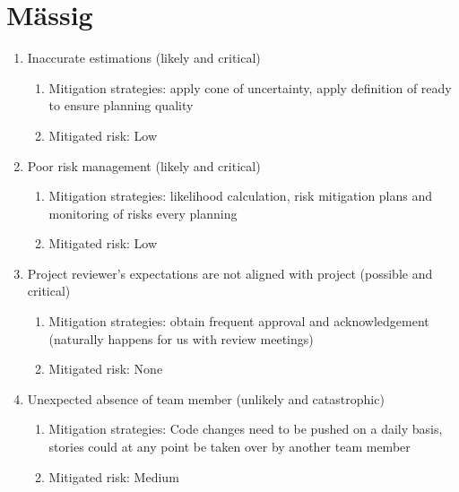 \section{Mässig}
\begin{enumerate}
    \item Inaccurate estimations (likely and critical) 
    \begin{enumerate}
        \item Mitigation strategies: apply cone of uncertainty, apply definition of ready to ensure planning quality
        \item Mitigated risk: Low
    \end{enumerate}

    \item Poor risk management (likely and critical)  
    \begin{enumerate}
        \item Mitigation strategies: likelihood calculation, risk mitigation plans and monitoring of risks every planning
        \item Mitigated risk: Low
    \end{enumerate}

    \item Project reviewer's expectations are not aligned with project (possible and critical) 
    \begin{enumerate}
        \item Mitigation strategies: obtain frequent approval and acknowledgement (naturally happens for us with review meetings)
        \item Mitigated risk: None
    \end{enumerate}

    \item Unexpected absence of team member (unlikely and catastrophic) 
    \begin{enumerate}
        \item Mitigation strategies: Code changes need to be pushed on a daily basis, stories could at any point be taken over by another team member
        \item Mitigated risk: Medium
    \end{enumerate}
\end{enumerate}

